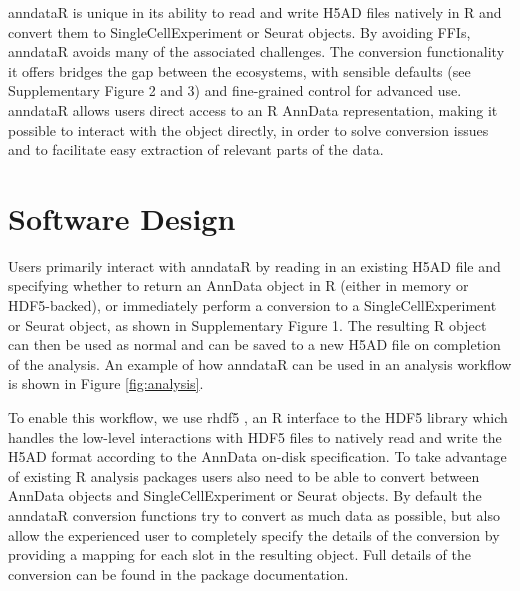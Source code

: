 \documentclass[unnumsec,webpdf,modern,large,namedate]{oup-authoring-template}%
\begin{document}
anndataR is unique in its ability to read and write H5AD files natively in R and convert them 
to SingleCellExperiment or Seurat objects. By avoiding FFIs, anndataR 
avoids many of the associated challenges. The conversion functionality it offers bridges the 
gap between the ecosystems, with sensible defaults (see Supplementary Figure 2 and 3) and fine-grained control for advanced use. 
anndataR allows users direct access to an R AnnData representation, making it possible to 
interact with the object directly, in order to solve conversion issues and to facilitate easy 
extraction of relevant parts of the data.

\section{Software Design}

Users primarily interact with anndataR by reading in an existing H5AD file and specifying 
whether to return an AnnData object in R (either in memory or HDF5-backed), or immediately 
perform a conversion to a SingleCellExperiment or Seurat object, as shown in Supplementary Figure 1. %
The resulting R object can then be used as normal and can be saved to a new H5AD file on 
completion of the analysis.
An example of how anndataR can be used in an analysis workflow is shown in Figure \ref{fig:analysis}.

To enable this workflow, we use rhdf5 \citep{rhdf5}, an R interface to the HDF5 
library which handles the low-level interactions with HDF5 files to natively read and write
the H5AD format according to the AnnData on-disk specification. To take advantage of existing
R analysis packages users also need to be able to convert between AnnData objects and 
SingleCellExperiment or Seurat objects. By default the anndataR conversion functions 
try to convert as much data as possible, but also allow the experienced user to completely
specify the details of the conversion by providing a mapping for each slot in the resulting
object. Full details of the conversion can be found in the package documentation.
\end{document}
